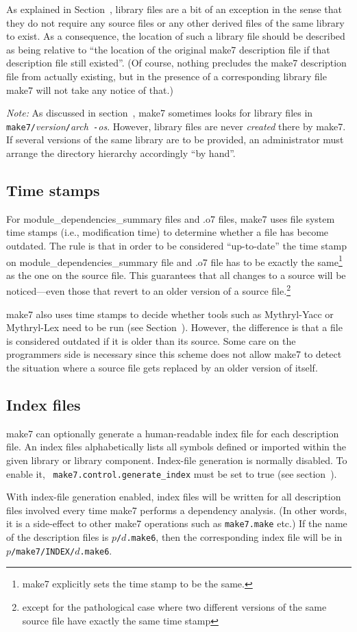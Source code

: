 As explained in Section~, library files are a bit of
an exception in the sense that they do not require any source files or
any other derived files of the same library to exist.  As a
consequence, the location of such a library file should be described
as being relative to ``the location of the original make7 description
file if that description file still existed''.  (Of course, nothing
precludes the make7 description file from actually existing, but in the
presence of a corresponding library file make7 will not take any notice
of that.)

{\em Note:} As discussed in section~, make7 sometimes
looks for library files in {\tt make7/}{\it version}{\tt /}{\it arch}{\tt
-}{\it os}.  However, library files are never {\em created} there by
make7.  If several versions of the same library are to be provided, an
administrator must arrange the directory hierarchy accordingly ``by
hand''.

\subsection{Time stamps}

For module_dependencies_summary files and .o7 files, make7 uses file system time stamps
(i.e., modification time) to determine whether a file has become
outdated.  The rule is that in order to be considered ``up-to-date''
the time stamp on module_dependencies_summary file and .o7 file has to be exactly the
same\footnote{make7 explicitly sets the time stamp to be the same.} as
the one on the source file.  This guarantees that all changes to a
source will be noticed---even those that revert to an older version of
a source file.\footnote{except for the pathological case where two
different versions of the same source file have exactly the same time
stamp}

make7 also uses time stamps to decide whether tools such as Mythryl-Yacc or
Mythryl-Lex need to be run (see Section~).  However, the
difference is that a file is considered outdated if it is older than
its source.  Some care on the programmers side is necessary since this
scheme does not allow make7 to detect the situation where a source file
gets replaced by an older version of itself.

\subsection{Index files}
\label{sec:indexfiles}

make7 can optionally generate a human-readable index file for each
description file.  An index files alphabetically lists all symbols
defined or imported within the given library or library component.
Index-file generation is normally disabled.  To enable it, {\tt
make7.control.generate\_index} must be set to true (see
section~).

With index-file generation enabled, index files will be written for
all description files involved every time make7 performs a dependency
analysis.  (In other words, it is a side-effect to other make7 operations
such as {\tt make7.make} etc.)  If the name of the description files is
{\tt $p$/$d$.make6}, then the corresponding index file will be in {\tt
$p$/make7/INDEX/$d$.make6}.
